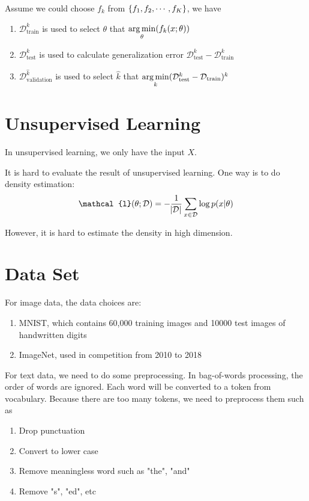 Assume we could choose $f_k$ from $\set{f_1, f_2, \cdots, f_K}$, we have
\begin{enumerate}
    \item $\mathcal{D}_{\text{train}}^k$ is used to select $\theta$ that $\mathop{\arg\min}\limits_{\theta}(f_k(x;\theta))$
    \item $\mathcal{D}_{\text{test}}^k$ is used to calculate generalization error $\mathcal{D}_{\text{test}}^k - \mathcal{D}_{\text{train}}^k$
    \item $\mathcal{D}_{\text{validation}}^{\hat{k}}$ is used to select $\hat{k}$ that $\mathop{\arg\min}\limits_{k}(\mathcal{D}_{\text{test}}^k - \mathcal{D}_{\text{train}})^k$
\end{enumerate}


\section{Unsupervised Learning}

In unsupervised learning, we only have the input $X$.

It is hard to evaluate the result of unsupervised learning. One way is to do density estimation:
\begin{equation}
    \mathcal{l}(\theta; \mathcal{D}) = - \frac{1}{\absolutevalue{\mathcal{D}}} \sum_{x \in \mathcal{D}} \log p(x|\theta)
\end{equation}

However, it is hard to estimate the density in high dimension.



\section{Data Set}

\begin{example}
    For image data, the data choices are:
\begin{enumerate}
    \item MNIST, which contains 60,000 training images and 10000 test images of handwritten digits
    \item ImageNet, used in competition from 2010 to 2018
\end{enumerate}
\end{example}

\begin{definition}
    For text data, we need to do some preprocessing. In bag-of-words processing, the order of words are ignored. Each word will be converted to a token from vocabulary. Because there are too many tokens, we need to preprocess them such as 
\begin{enumerate}
    \item Drop punctuation
    \item Convert to lower case
    \item Remove meaningless word such as "the", "and"
    \item Remove "s", "ed", etc
\end{enumerate}
\end{definition}

